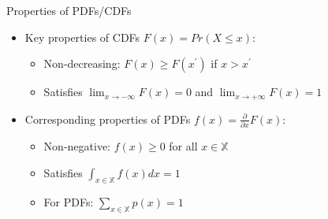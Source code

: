 \documentclass[11pt,english,handout]{beamer}
\begin{document}
\begin{frame}{Properties of PDFs/CDFs}
\vspace{0.2cm}
\begin{itemize}
\item Key properties of CDFs $F(x)=Pr(X\le x)$: 
\smallskip

\begin{itemize}
\item Non-decreasing: $F(x)\ge F(x^\prime)$ if $x > x^\prime$
\vspace{0.1cm}
\item Satisfies $\lim_{x\rightarrow -\infty} F(x)=0$ and $\lim_{x\rightarrow +\infty}F(x)=1$
\end{itemize}
\vspace{0.5cm}
\pause{}

\item Corresponding properties of PDFs $f(x)=\frac{\partial}{\partial x}F(x)$: 
\smallskip

\begin{itemize}
\item Non-negative: $f(x)\ge 0$ for all $x\in\mathbb{X}$
\vspace{0.1cm}
\item Satisfies $\int_{x\in\mathbb{X}}f(x)dx=1$
\vspace{0.1cm}
\item For PDFs: $\sum_{x\in\mathbb{X}}p(x)=1$
\end{itemize}
\end{itemize}

\end{frame}
\end{document}
